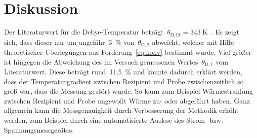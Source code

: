 \section{Diskussion}
\label{sec:diskussion}
%
Der Literaturwert für die Debye-Temperatur
beträgt~$\theta_{\mathrm{D,lit}}=\SI{343}{\kelvin}$~\cite{kittel}.
Es zeigt sich, dass dieser nur um ungefähr~\SI{3}{\percent}
von~$\theta_{\mathrm{D,2}}$ abweicht, welcher mit Hilfe theoretischer
Überlegungen aus Forderung~\eqref{eq:konv} bestimmt wurde.
Viel größer ist hingegen die Abweichung des im Versuch gemessenen
Wertes~$\theta_{\mathrm{D,1}}$ vom Literaturwert. Diese beträgt
rund~\SI{11.5}{\percent} und könnte dadurch erklärt werden, dass der
Temperaturgradient zwischen Rezipient und Probe zwischenzeitlich so groß war,
dass die Messung gestört wurde. So kann zum Beispiel Wärmestrahlung zwischen
Rezipient und Probe ungewollt Wärme zu- oder abgeführt haben. Ganz allgemein
kann die Messgenauigkeit durch Verbesserung der Methodik erhöht werden, zum
Beispiel durch eine automatisierte Auslese des Strom- bzw. Spannungsmessgerätes.
